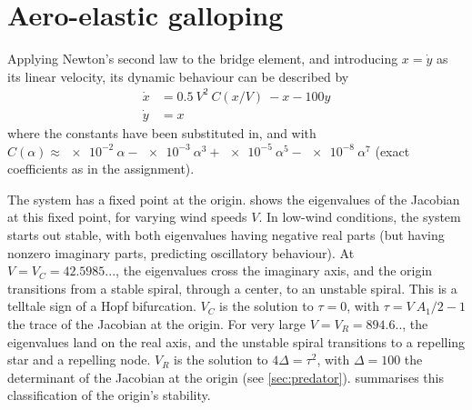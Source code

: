 \graphicspath{{../figures/4/}}


\chapter{Aero-elastic galloping}

Applying Newton's second law to the bridge element, and introducing $x = \dot{y}$ as its linear velocity, its dynamic behaviour can be described by
%
\begin{align*}
\dot{x} &= 0.5\ V^2\ C(x/V)\ - x - 100y \\
\dot{y} &= x
\end{align*}
%
where the constants have been substituted in, and with $C(\alpha) \approx \num{e-2}\ \alpha - \num{e-3}\ \alpha^3 + \num{e-5}\ \alpha^5 - \num{e-8}\ \alpha^7$ (exact coefficients as in the assignment).


The system has a fixed point at the origin.  shows the eigenvalues of the Jacobian at this fixed point, for varying wind speeds $V$. In low-wind conditions, the system starts out stable, with both eigenvalues having negative real parts (but having nonzero imaginary parts, predicting oscillatory behaviour). At $V = V_C = 42.5985...$, the eigenvalues cross the imaginary axis, and the origin transitions from a stable spiral, through a center, to an unstable spiral. This is a telltale sign of a Hopf bifurcation. $V_C$ is the solution to $\tau = 0$, with $\tau = V\ A_1 / 2 - 1$ the trace of the Jacobian at the origin. For very large $V = V_R = 894.6..$, the eigenvalues land on the real axis, and the unstable spiral transitions to a repelling star and a repelling node. $V_R$ is the solution to $4 \Delta = \tau^2$, with $\Delta = 100$ the determinant of the Jacobian at the origin (see \cref{sec:predator}).  summarises this classification of the origin's stability.

